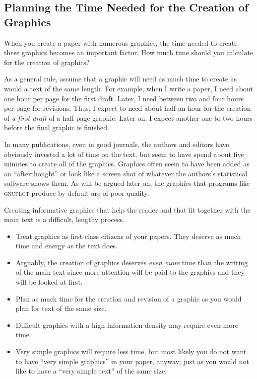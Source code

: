 \subsection{Planning the Time Needed for the Creation of Graphics}

When you create a paper with numerous graphics, the time needed to
create these graphics becomes an important factor. How much time
should you calculate for the creation of graphics?

As a general rule, assume that a graphic will need as much time to
create as would a text of the same length. For example, when I
write a paper, I need about one hour per page for
the first draft. Later, I need between two and four hours per page
for revisions. Thus, I expect to need about half an hour for the
creation of \emph{a first draft} of a half page graphic. Later on, I
expect another one to two hours before the final graphic is finished.

In many publications, even in good journals, the authors and editors
have obviously  invested a lot of time on the text, but seem to 
have spend about five minutes to create all of the
graphics. Graphics often seem to have been added as an
``afterthought'' or look like a screen shot of whatever the authors's
statistical software shows them. As will be argued later on, the
graphics that programs like \textsc{gnuplot} produce by default are of
poor quality.

Creating informative graphics that help the reader and that fit
together with the main text is a difficult, lengthy process. 
\begin{itemize}
\item
  Treat graphics as first-class citizens of your papers. They deserve
  as much time and energy as the text does.
\item
  Arguably, the creation of graphics deserves \emph{even more} time
  than the writing of the main text since more attention will  be paid
  to the graphics and they will be looked at first. 
\item
  Plan as much time for the creation and revision of a graphic as you
  would plan for text of the same size.
\item
  Difficult graphics with a high information density may require even
  more time.
\item
  Very simple graphics will require less time, but most likely you do
  not want to have ``very simple graphics'' in your paper, anyway;
  just as you would not like to have a ``very simple text'' of the
  same size.  
\end{itemize}



